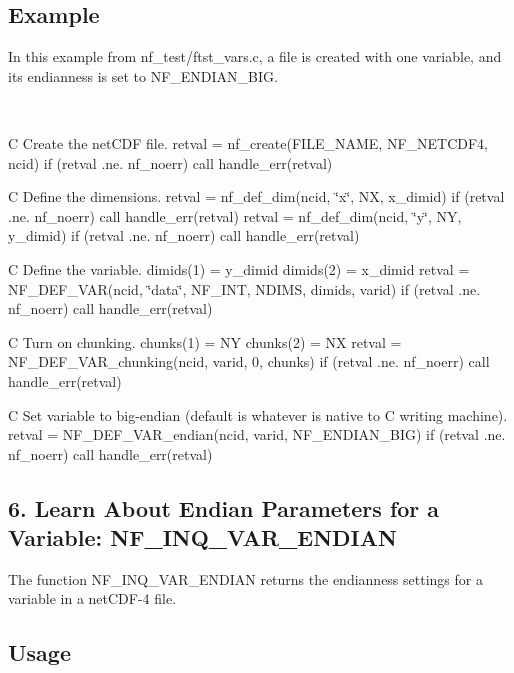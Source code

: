 \subsection*{Example }

In this example from nf\+\_\+test/ftst\+\_\+vars.\+c, a file is created with one variable, and its endianness is set to N\+F\+\_\+\+E\+N\+D\+I\+A\+N\+\_\+\+B\+IG.

 

C Create the net\+C\+DF file. retval = nf\+\_\+create(\+F\+I\+L\+E\+\_\+\+N\+A\+M\+E, N\+F\+\_\+\+N\+E\+T\+C\+D\+F4, ncid) if (retval .ne. nf\+\_\+noerr) call handle\+\_\+err(retval)

C Define the dimensions. retval = nf\+\_\+def\+\_\+dim(ncid, \char`\"{}x\char`\"{}, NX, x\+\_\+dimid) if (retval .ne. nf\+\_\+noerr) call handle\+\_\+err(retval) retval = nf\+\_\+def\+\_\+dim(ncid, \char`\"{}y\char`\"{}, NY, y\+\_\+dimid) if (retval .ne. nf\+\_\+noerr) call handle\+\_\+err(retval)

C Define the variable. dimids(1) = y\+\_\+dimid dimids(2) = x\+\_\+dimid retval = N\+F\+\_\+\+D\+E\+F\+\_\+\+V\+AR(ncid, \char`\"{}data\char`\"{}, N\+F\+\_\+\+I\+NT, N\+D\+I\+MS, dimids, varid) if (retval .ne. nf\+\_\+noerr) call handle\+\_\+err(retval)

C Turn on chunking. chunks(1) = NY chunks(2) = NX retval = N\+F\+\_\+\+D\+E\+F\+\_\+\+V\+A\+R\+\_\+chunking(ncid, varid, 0, chunks) if (retval .ne. nf\+\_\+noerr) call handle\+\_\+err(retval)

C Set variable to big-\/endian (default is whatever is native to C writing machine). retval = N\+F\+\_\+\+D\+E\+F\+\_\+\+V\+A\+R\+\_\+endian(ncid, varid, N\+F\+\_\+\+E\+N\+D\+I\+A\+N\+\_\+\+B\+I\+G) if (retval .ne. nf\+\_\+noerr) call handle\+\_\+err(retval)

\subsection*{6. Learn About Endian Parameters for a Variable\+: {\ttfamily N\+F\+\_\+\+I\+N\+Q\+\_\+\+V\+A\+R\+\_\+\+E\+N\+D\+I\+AN} }

The function N\+F\+\_\+\+I\+N\+Q\+\_\+\+V\+A\+R\+\_\+\+E\+N\+D\+I\+AN returns the endianness settings for a variable in a net\+C\+D\+F-\/4 file.

\subsection*{Usage }

